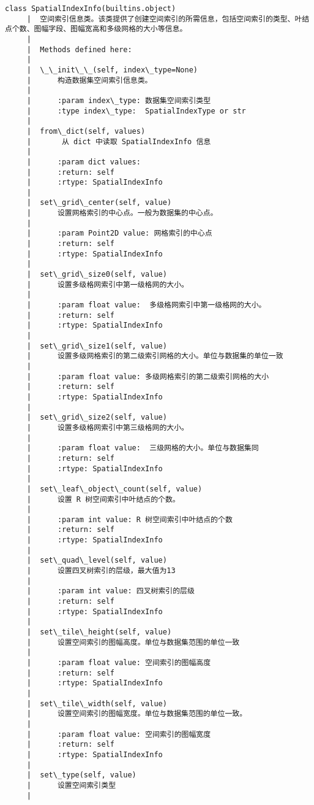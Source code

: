 \documentclass[11pt]{article}
\begin{document}
\begin{Verbatim}[commandchars=\\\{\}]
    class SpatialIndexInfo(builtins.object)
     |  空间索引信息类。该类提供了创建空间索引的所需信息，包括空间索引的类型、叶结点个数、图幅字段、图幅宽高和多级网格的大小等信息。
     |  
     |  Methods defined here:
     |  
     |  \_\_init\_\_(self, index\_type=None)
     |      构造数据集空间索引信息类。
     |      
     |      :param index\_type: 数据集空间索引类型
     |      :type index\_type:  SpatialIndexType or str
     |  
     |  from\_dict(self, values)
     |       从 dict 中读取 SpatialIndexInfo 信息
     |      
     |      :param dict values:
     |      :return: self
     |      :rtype: SpatialIndexInfo
     |  
     |  set\_grid\_center(self, value)
     |      设置网格索引的中心点。一般为数据集的中心点。
     |      
     |      :param Point2D value: 网格索引的中心点
     |      :return: self
     |      :rtype: SpatialIndexInfo
     |  
     |  set\_grid\_size0(self, value)
     |      设置多级格网索引中第一级格网的大小。
     |      
     |      :param float value:  多级格网索引中第一级格网的大小。
     |      :return: self
     |      :rtype: SpatialIndexInfo
     |  
     |  set\_grid\_size1(self, value)
     |      设置多级网格索引的第二级索引网格的大小。单位与数据集的单位一致
     |      
     |      :param float value: 多级网格索引的第二级索引网格的大小
     |      :return: self
     |      :rtype: SpatialIndexInfo
     |  
     |  set\_grid\_size2(self, value)
     |      设置多级格网索引中第三级格网的大小。
     |      
     |      :param float value:  三级网格的大小。单位与数据集同
     |      :return: self
     |      :rtype: SpatialIndexInfo
     |  
     |  set\_leaf\_object\_count(self, value)
     |      设置 R 树空间索引中叶结点的个数。
     |      
     |      :param int value: R 树空间索引中叶结点的个数
     |      :return: self
     |      :rtype: SpatialIndexInfo
     |  
     |  set\_quad\_level(self, value)
     |      设置四叉树索引的层级，最大值为13
     |      
     |      :param int value: 四叉树索引的层级
     |      :return: self
     |      :rtype: SpatialIndexInfo
     |  
     |  set\_tile\_height(self, value)
     |      设置空间索引的图幅高度。单位与数据集范围的单位一致
     |      
     |      :param float value: 空间索引的图幅高度
     |      :return: self
     |      :rtype: SpatialIndexInfo
     |  
     |  set\_tile\_width(self, value)
     |      设置空间索引的图幅宽度。单位与数据集范围的单位一致。
     |      
     |      :param float value: 空间索引的图幅宽度
     |      :return: self
     |      :rtype: SpatialIndexInfo
     |  
     |  set\_type(self, value)
     |      设置空间索引类型
     |      

\end{Verbatim}
\end{document}
